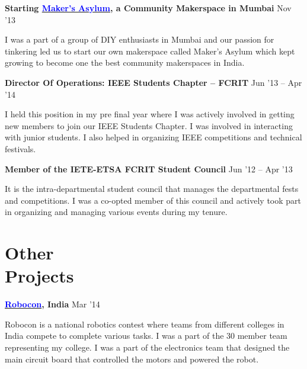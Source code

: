 \documentclass[margin,line]{res}
\newenvironment{list1}{
  \begin{list}{\ding{113}}{%
      \setlength{\itemsep}{0in}
      \setlength{\parsep}{0in} \setlength{\parskip}{0in}
      \setlength{\topsep}{0in} \setlength{\partopsep}{0in} 
      \setlength{\leftmargin}{0.17in}}}{\end{list}}
\begin{document}
\begin{resume}
{\bf Starting \href{http://makersasylum.com}{\textcolor{blue} {Maker's Asylum}}, a Community Makerspace in Mumbai} \hfill {Nov  '13} \\
\vspace*{-.13in}
\begin{list1}
\item[]
I was a part of a group of DIY enthusiasts in Mumbai and our passion for tinkering led us to start our own makerspace called Maker's Asylum which kept growing to become one the best community makerspaces in India.
\end{list1}

{\bf Director Of Operations: IEEE Students Chapter -- FCRIT} \hfill {Jun '13 -- Apr '14} \\
\vspace*{-.13in}
\begin{list1}
\item[]
I held this position in my pre final year where I was actively involved in getting new members to join our IEEE Students Chapter. I was involved in interacting with junior students. I also helped in organizing IEEE competitions and technical festivals.
\end{list1}

{\bf Member of the IETE-ETSA FCRIT Student Council} \hfill {Jun '12 -- Apr '13} \\
\vspace*{-.13in}
\begin{list1}
\item[]
It is the intra-departmental student council that manages the departmental fests and competitions. I was a co-opted member of this council and actively took part in organizing and managing various events during my tenure.
\end{list1}

\section{\sc Other \\Projects}
{\bf \href{http://www.roboconindia.com}{\textcolor{blue} {Robocon}}, India} \hfill {Mar '14} \\
\vspace*{-.15in}
\begin{list1}
\item[] 
Robocon is a national robotics contest where teams from different colleges in India compete to complete various tasks. I was a part of the 30 member team representing my college. I was a part of the electronics team that designed the main circuit board that controlled the motors and powered the robot.  
\end{list1}


\end{resume}
\end{document}
